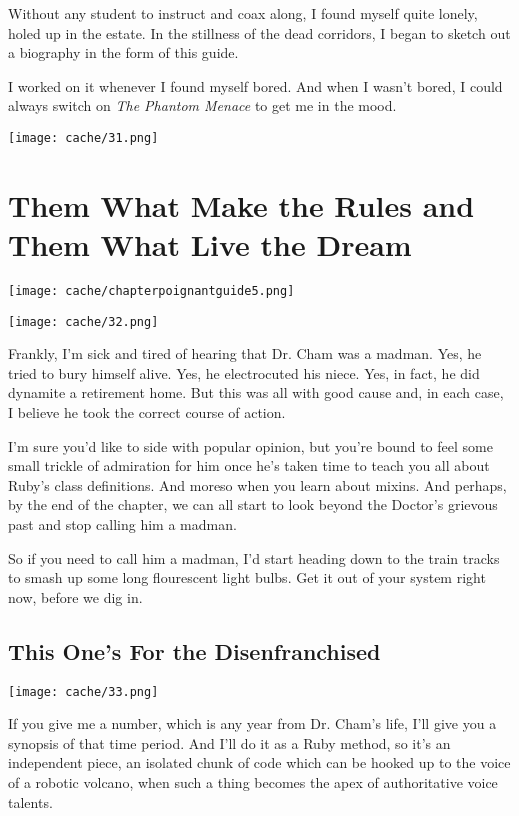 \documentclass[12pt,twoside]{report}
\begin{document}
Without any student to instruct and coax along, I found myself quite
lonely, holed up in the estate.  In the stillness of the dead
corridors, I began to sketch out a biography in the form of this
guide.

I worked on it whenever I found myself bored.  And when I wasn't
bored, I could always switch on {\em The Phantom Menace} to get me in
the mood.

	\texttt{[image: cache/31.png]}
\newpage
\thispagestyle{empty}
\mbox{}
\cleartooddpage


\chapter{Them What Make the Rules and Them What Live the Dream}
\vfill
\begin{center}
  \texttt{[image: cache/chapterpoignantguide5.png]}
\end{center}
\vspace{2cm}
\newpage
\thispagestyle{empty}
\mbox{}
\clearpage
	\texttt{[image: cache/32.png]}

Frankly, I'm sick and tired of hearing that Dr. Cham was a madman.
Yes, he tried to bury himself alive.  Yes, he electrocuted his niece.
Yes, in fact, he did dynamite a retirement home.  But this was all
with good cause and, in each case, I believe he took the correct
course of action.

I'm sure you'd like to side with popular opinion, but you're bound to
feel some small trickle of admiration for him once he's taken time to
teach you all about Ruby's class definitions. And moreso when you
learn about mixins.  And perhaps, by the end of the chapter, we can
all start to look beyond the Doctor's grievous past and stop calling
him a madman.

So if you need to call him a madman, I'd start heading down to the
train tracks to smash up some long flourescent light bulbs.  Get it
out of your system right now, before we dig in.


\section{This One's For the Disenfranchised}


	\texttt{[image: cache/33.png]}

If you give me a number, which is any year from Dr. Cham's life, I'll
give you a synopsis of that time period.  And I'll do it as a Ruby
method, so it's an independent piece, an isolated chunk of code which
can be hooked up to the voice of a robotic volcano, when such a thing
becomes the apex of authoritative voice talents.
\end{document}
